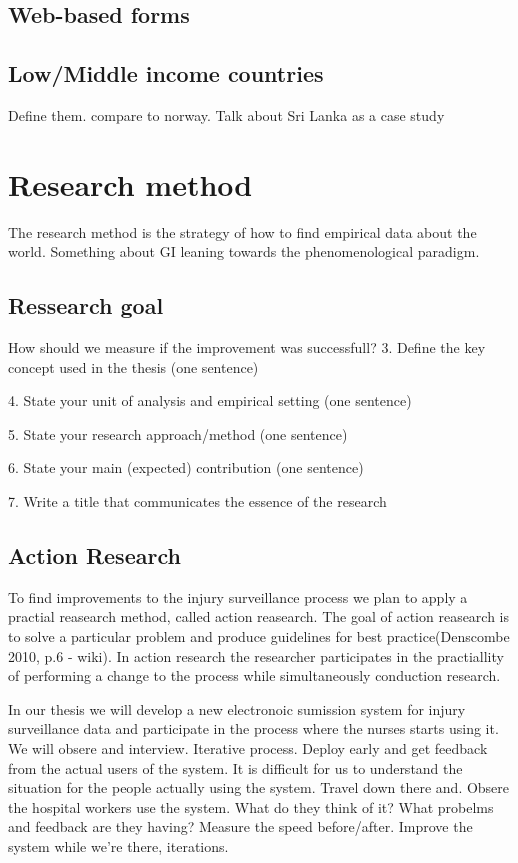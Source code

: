 \documentclass[UKenglish, 12pt]{article}
\begin{document}
\subsection*{Web-based forms}

\subsection*{Low/Middle income countries}
Define them. compare to norway. Talk about Sri Lanka as a case study

 

\section*{Research method}
The research method is the strategy of how to find empirical data about the world. Something about GI leaning towards the phenomenological paradigm.
\subsection{Ressearch goal}
How should we measure if the improvement was successfull?
3. Define the key concept used in the thesis (one sentence)

4. State your unit of analysis and empirical setting (one sentence)

5. State your research approach/method (one sentence)

6. State your main (expected) contribution (one sentence)

7. Write a title that communicates the essence of the research

\subsection{Action Research}
To find improvements to the injury surveillance process we plan to apply a practial reasearch method, called action reasearch. The goal of action reasearch is to solve a particular problem and produce guidelines for best practice(Denscombe 2010, p.6 - wiki). In action research the researcher participates in the practiallity of performing a change to the process while simultaneously conduction research.

In our thesis we will develop a new electronoic sumission system for injury surveillance data and participate in the process where the nurses starts using it. We will obsere and interview. Iterative process. Deploy early and get feedback from the actual users of the system. It is difficult for us to understand the situation for the people actually using the system. Travel down there and. Obsere the hospital workers use the system. What do they think of it? What probelms and feedback are they having? Measure the speed before/after. Improve the system while we're there, iterations.
\end{document}
